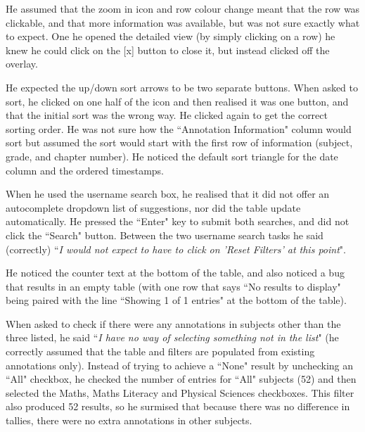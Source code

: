 He assumed that the zoom in icon and row colour change meant that the row was clickable, and that more information was available, but was not sure exactly what to expect. One he opened the detailed view (by simply clicking on a row) he knew he could click on the [x] button to close it, but instead clicked off the overlay. 

He expected the up/down sort arrows to be two separate buttons. When asked to sort, he clicked on one half of the icon and then realised it was one button, and that the initial sort was the wrong way. He clicked again to get the correct sorting order. He was not sure how the ``Annotation Information" column would sort but assumed the sort would start with the first row of information (subject, grade, and chapter number). He noticed the default sort triangle for the date column and  the ordered timestamps. 

When he used the username search box, he realised that it did not offer an autocomplete dropdown list of suggestions, nor did the table update automatically. He pressed the ``Enter" key to submit both searches, and did not click the ``Search" button. Between the two username search tasks he said (correctly) ``\textit{I would not expect to have to click on 'Reset Filters' at this point}".

He noticed the counter text at the bottom of the table, and also noticed a bug that results in an empty table (with one row that says ``No results to display" being paired with the line ``Showing 1 of 1 entries" at the bottom of the table). 

When asked to check if there were any annotations in subjects other than the three listed, he said ``\textit{I have no way of selecting something not in the list}" (he correctly assumed that the table and filters are populated from existing annotations only). Instead of trying to achieve a ``None" result by unchecking an ``All" checkbox, he checked the number of entries for ``All" subjects (52) and then selected the Maths, Maths Literacy and Physical Sciences checkboxes. This filter also produced 52 results, so he surmised that because there was no difference in tallies, there were no extra annotations in other subjects.

